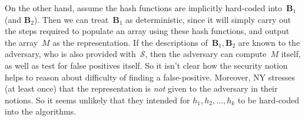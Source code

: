 %

On the other hand, assume the hash functions are implicitly hard-coded into~$\mathbf{B}_1$ (and $\mathbf{B}_2$). Then we can treat~$\mathbf{B}_1$ as deterministic, since it will simply carry out the steps required to populate an array using these hash functions, and output the array~$M$ as the representation.  If the descriptions of~$\mathbf{B}_1,\mathbf{B}_2$ are known to the adversary, who is also provided with~$\mathcal{S}$, then the adversary can compute~$M$ itself, as well as test for false positives itself. So it isn't clear how the security notion helps to reason about difficulty of finding a false-positive. Moreover, NY stresses (at least once) that the representation is \emph{not} given to the adversary in their notions.  So it seems unlikely that they intended for $h_1,h_2,\ldots,h_k$ to be hard-coded into the algorithms.

